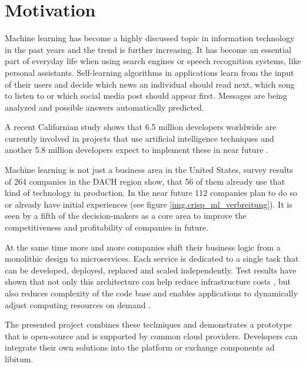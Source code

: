 \section{Motivation}\label{motivation}

Machine learning has become a highly discussed topic in information
technology in the past years and the trend is further increasing. It has
become an essential part of everyday life when using search engines or
speech recognition systems, like personal assistants. Self-learning
algorithms in applications learn from the input of their users and
decide which news an individual should read next, which song to listen
to or which social media post should appear first. Messages are being
analyzed and possible answers automatically predicted.

A recent Californian study shows that 6.5 million developers worldwide
are currently involved in projects that use artificial intelligence
techniques and another 5.8 million developers expect to implement these
in near future \cite{evans}.

Machine learning is not just a business area in the United States,
survey results of 264 companies in the DACH region show, that 56 of them
already use that kind of technology in production. In the near future
112 companies plan to do so or already have initial experiences (see
figure \ref{img.crisp_ml_verbreitung}). It is seen by a fifth of the
decision-makers as a core area to improve the competitiveness and
profitability of companies in future. \cite{crisp}


At the same time more and more companies shift their business logic from
a monolithic design to microservices. Each service is dedicated to a
single task that can be developed, deployed, replaced and scaled
independently. Test results have shown that not only this architecture
can help reduce infrastructure costs
\cite{villamizar2}\cite{villamizar}, but also reduces complexity of the
code base and enables applications to dynamically adjust computing
resources on demand \cite{villamizar}.

The presented project combines these techniques and demonstrates a
prototype that is open-source and is supported by common cloud
providers. Developers can integrate their own solutions into the
platform or exchange components ad libitum.

